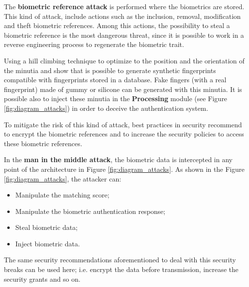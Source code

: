 
The \textbf{biometric reference attack} is performed where the biometrics are stored. This kind of attack, include actions such as the inclusion, removal, modification and theft biometric references. Among this actions, the possibility to steal a biometric reference is the most dangerous threat, since it is possible to work in a reverse engineering process to regenerate the biometric trait. 

Using a hill climbing technique to optimize to the position and the orientation of the minutia \cite{MartinezDiaz2006} and \cite{hill2001risk} show that is possible to generate synthetic fingerprints compatible with fingerprints stored in a database. Fake fingers (with a real fingerprint) made of gummy or silicone can be generated with this minutia. It is possible also to inject these minutia in the \textbf{Processing} module (see Figure \ref{fig:diagram_attacks}) in order to deceive the authentication system. 

To mitigate the risk of this kind of attack, best practices in security recommend to encrypt the biometric references and to increase the security policies to access these biometric references. 


In the \textbf{man in the middle attack}, the biometric data is intercepted in any point of the architecture in Figure \ref{fig:diagram_attacks}.  As shown in the Figure \ref{fig:diagram_attacks}, the attacker can:
\begin{itemize}
        \item Manipulate the matching score;
        \item Manipulate the biometric authentication response;
        \item Steal biometric data;
        \item Inject biometric data.
\end{itemize}

The same security recommendations aforementioned to deal with this security breaks can be used here; i.e. encrypt the data before transmission, increase the security grants and so on. 

